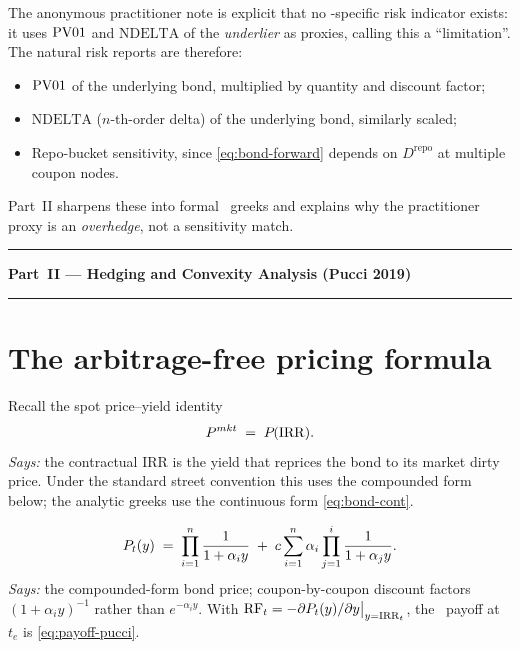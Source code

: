 \documentclass[11pt,a4paper]{article}
\newcommand{\Tlock}{\text{T-Lock}}
\newcommand{\RF}{\mathrm{RF}}
\newcommand{\NDELTA}{\mathrm{NDELTA}}
\newcommand{\Drepo}{D^{\mathrm{repo}}}
\begin{document}
The anonymous practitioner note is explicit that no
\Tlock-specific risk indicator exists: it uses $\mathrm{PV01}$ and $\NDELTA$
of the \emph{underlier} as proxies, calling this a ``limitation''.
The natural risk reports are therefore:
\begin{itemize}[noitemsep]
\item $\mathrm{PV01}$ of the underlying bond, multiplied by quantity and discount factor;
\item $\NDELTA$ ($n$-th-order delta) of the underlying bond, similarly scaled;
\item Repo-bucket sensitivity, since \eqref{eq:bond-forward} depends
      on $\Drepo$ at multiple coupon nodes.
\end{itemize}
Part~II sharpens these into formal \Tlock\ greeks and explains why
the practitioner proxy is an \emph{overhedge}, not a sensitivity match.

\bigskip\hrule\medskip
\begin{center}\Large\bfseries Part~II --- Hedging and Convexity Analysis (Pucci 2019)\end{center}
\hrule\bigskip

\section{The arbitrage-free pricing formula}\label{sec:af-price}

Recall the spot price--yield identity
\begin{equation}\label{eq:irr-def}
  P^{mkt} \;=\; P_{}(\mathrm{IRR}).
\end{equation}
\textit{Says:} the contractual IRR is the yield that reprices the
bond to its market dirty price. Under the standard street convention
this uses the compounded form below; the analytic greeks use the
continuous form \eqref{eq:bond-cont}.

\begin{equation}\label{eq:cmt-ytm-compounded}
  P_{t}(y) \;=\; \prod_{i=1}^n \frac{1}{1+\alpha_i y}
                \;+\; c \sum_{i=1}^n \alpha_i \prod_{j=1}^i \frac{1}{1+\alpha_j y}.
\end{equation}
\textit{Says:} the compounded-form bond price; coupon-by-coupon
discount factors $(1+\alpha_i y)^{-1}$ rather than $e^{-\alpha_i y}$.
With $\RF_t = -\partial \Bond{t}{y}/\partial y\big|_{y=\IRR_t}$, the
\Tlock\ payoff at $t_e$ is \eqref{eq:payoff-pucci}.
\end{document}
